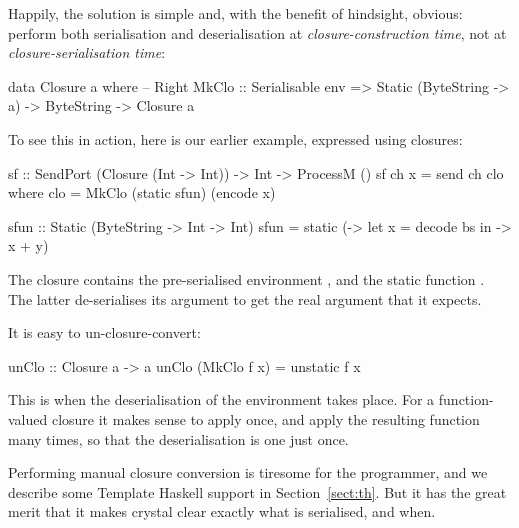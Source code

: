 \documentclass[preprint]{sigplanconf}
\begin{document}
Happily, the solution is simple and, with the benefit of hindsight,
obvious: perform both serialisation and deserialisation at \emph{closure-construction time},
not at \emph{closure-serialisation time}:
\begin{code}
data Closure a where   -- Right
  MkClo :: Serialisable env
        => Static (ByteString -> a) 
        -> ByteString -> Closure a
\end{code}
To see this in action, here is our earlier  example, 
expressed using closures:
\begin{code}
  sf :: SendPort (Closure (Int -> Int)) 
     -> Int -> ProcessM ()
  sf ch x = send ch clo
    where
      clo  = MkClo (static sfun) (encode x)

  sfun :: Static (ByteString -> Int -> Int)
  sfun = static (\bs -> let x = decode bs 
                        in \y -> x + y)
\end{code}
The closure contains the pre-serialised environment ,
and the static function . The latter de-serialises its
argument  to get the real argument  that it expects.

It is easy to un-closure-convert:
\begin{code}
  unClo :: Closure a -> a
  unClo (MkClo f x) = unstatic f x
\end{code}
This is when the deserialisation of the environment takes place. For a
function-valued closure it makes sense to apply  once, and
apply the resulting function many times, so that the deserialisation is
one just once.

Performing manual closure conversion is tiresome for the programmer,
and we describe some Template Haskell support in
Section~\ref{sect:th}.  But it has the great merit that it makes
crystal clear exactly what is serialised, and when.  
\end{document}
